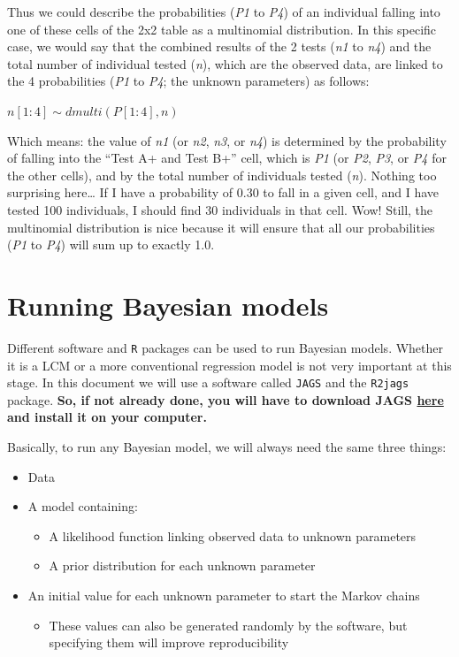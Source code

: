 \documentclass[
]{book}
\providecommand{\tightlist}{%
  \setlength{\itemsep}{0pt}\setlength{\parskip}{0pt}}
\begin{document}
Thus we could describe the probabilities (\emph{P1} to \emph{P4}) of an individual falling into one of these cells of the 2x2 table as a multinomial distribution. In this specific case, we would say that the combined results of the 2 tests (\emph{n1} to \emph{n4}) and the total number of individual tested (\emph{n}), which are the observed data, are linked to the 4 probabilities (\emph{P1} to \emph{P4}; the unknown parameters) as follows:

\(n[1:4] \sim dmulti(P[1:4], n)\)

Which means: the value of \emph{n1} (or \emph{n2}, \emph{n3}, or \emph{n4}) is determined by the probability of falling into the ``Test A+ and Test B+'' cell, which is \emph{P1} (or \emph{P2}, \emph{P3}, or \emph{P4} for the other cells), and by the total number of individuals tested (\emph{n}). Nothing too surprising here\ldots{} If I have a probability of 0.30 to fall in a given cell, and I have tested 100 individuals, I should find 30 individuals in that cell. Wow! Still, the multinomial distribution is nice because it will ensure that all our probabilities (\emph{P1} to \emph{P4}) will sum up to exactly 1.0.

\chapter{Running Bayesian models}\label{running-bayesian-models}

Different software and \texttt{R} packages can be used to run Bayesian models. Whether it is a LCM or a more conventional regression model is not very important at this stage. In this document we will use a software called \texttt{JAGS} and the \texttt{R2jags} package. \textbf{So, if not already done, you will have to download JAGS \href{https://sourceforge.net/projects/mcmc-jags/files/}{here} and install it on your computer.}

Basically, to run any Bayesian model, we will always need the same three things:

\begin{itemize}
\tightlist
\item
  Data
\item
  A model containing:

  \begin{itemize}
  \tightlist
  \item
    A likelihood function linking observed data to unknown parameters
  \item
    A prior distribution for each unknown parameter
  \end{itemize}
\item
  An initial value for each unknown parameter to start the Markov chains

  \begin{itemize}
  \tightlist
  \item
    These values can also be generated randomly by the software, but specifying them will improve reproducibility
  \end{itemize}
\end{itemize}
\end{document}
